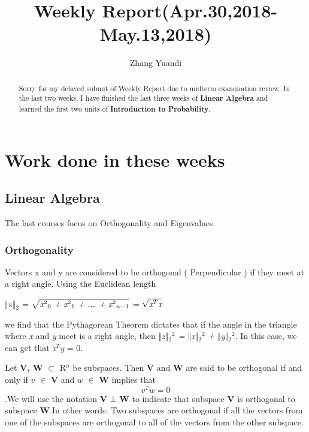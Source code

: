 \documentclass{article}
\title{Weekly Report(Apr.30,2018-May.13,2018)}
\author{Zhang Yuandi}
\begin{document}
\maketitle

\begin{abstract}
Sorry for my delayed submit of Weekly Report due to midterm examination review. In the last two weeks, I have finished the last three weeks of \textbf{Linear Algebra} and learned the first two units of \textbf{Introduction to Probability}.
\end{abstract}

\section{Work done in these weeks}

\subsection{Linear Algebra}

The last courses focus on Orthogonality and Eigenvalues.

\subsubsection{Orthogonality}


Vectors x and y are considered to be orthogonal ( Perpendicular ) if they meet at a right angle. Using the Euclidean length
\begin{center}
$\Vert$x$\Vert$$_{2}$ = $\sqrt{\emph{x$^{2}$$_{0}$ + x$^{2}$$_{1}$ + ... + x$^{2}$$_{n-1}$}}$ = $\sqrt{\emph{x$^{T}$x}}$
\end{center}
we find that the Pythagorean Theorem dictates that if the angle in the triangle where \emph{x} and \emph{y} meet is a right angle, then \emph{$\Vert$z$\Vert$$_{2}$$^{2}$ = $\Vert$x$\Vert$$_{2}$$^{2}$ +  $\Vert$y$\Vert$$_{2}$$^{2}$}. In this case, we can get that \emph{x$^{T}$y} = 0.


Let \textbf{V, W} $\subset$ R$^{n}$ be subspaces. Then \textbf{V} and \textbf{W} are said to be orthogonal if and only if $v$ $\in$ \textbf{V} and $w$ $\in$ \textbf{W} implies that \[ v^Tw = 0\].We will use the notation \textbf{V} $\bot$ \textbf{W} to indicate that subspace \textbf{V} is orthogonal to subspace \textbf{W}.In other words: Two subspaces are orthogonal if all the vectors from one of the subspaces are orthogonal to all of the vectors from the other subspace.
\end{document}
